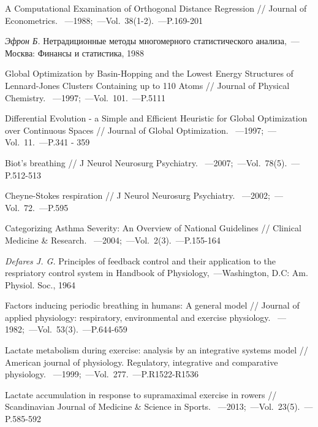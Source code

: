 \begin{thebibliography}{}
  A Computational Examination of Orthogonal Distance Regression // Journal of Econometrics. ~---1988;~---Vol.~38(1-2).~---P.169-201
  
  {\it Эфрон Б.} Нетрадиционные методы многомерного статистического анализа,~---Москва:  Финансы и статистика, 1988
  
   Global Optimization by Basin-Hopping and the Lowest Energy Structures of Lennard-Jones Clusters Containing up to 110 Atoms // Journal of Physical Chemistry. ~---1997;~---Vol.~101.~---P.5111
  
   Differential Evolution - a Simple and Efficient Heuristic for Global Optimization over Continuous Spaces // Journal of Global Optimization. ~---1997;~---Vol.~11.~---P.341 - 359

   Biot’s breathing // J Neurol Neurosurg Psychiatry. ~---2007;~---Vol.~78(5).~---P.512-513
    
   Cheyne-Stokes respiration // J Neurol Neurosurg Psychiatry. ~---2002;~---Vol.~72.~---P.595
  
   Categorizing Asthma Severity: An Overview of National Guidelines // Clinical Medicine \& Research. ~---2004;~---Vol.~2(3).~---P.155-164
  
   {\it Defares J. G.} Principles of feedback control and their application to the respriatory control system in Handbook of Physiology,~---Washington, D.C:  Am. Physiol. Soc., 1964
  
   Factors inducing periodic breathing in humans: A general model // Journal of applied physiology: respiratory, environmental and exercise physiology. ~---1982;~---Vol.~53(3).~---P.644-659
  
   Lactate metabolism during exercise: analysis by an integrative systems model // American journal of physiology. Regulatory, integrative and comparative physiology. ~---1999;~---Vol.~277.~---P.R1522-R1536
  
   Lactate accumulation in response to supramaximal exercise in rowers // Scandinavian Journal of Medicine \& Science in Sports. ~---2013;~---Vol.~23(5).~---P.585-592
  

\end{thebibliography}
